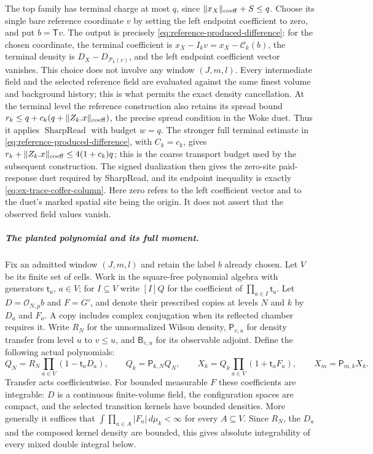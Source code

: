 The top family has terminal charge at most \(q\), since
\(\|x_X\|_{\rm coeff}+S\le q\). Choose its single bare reference coordinate \(v\) by
setting the left endpoint coefficient to zero, and put \(b=\mathsf Tv\).
The output is precisely
\eqref{eq:reference-produced-difference}: for the chosen coordinate, the
terminal coefficient is \(x_X-I_kv=x_X-\mathcal C_k(b)\), the terminal
density is
\(D_X-D_{\mathcal P_k(v)}\), and the left endpoint coefficient vector
vanishes. This choice does not involve any window \((J,m,l)\). Every intermediate field and the selected reference field are
evaluated against the same finest volume and background history; this is
what permits the exact density cancellation. At the terminal level the reference construction also retains its spread
bound \(r_k\le q+c_k(q+\|Z_k.x\|_{\rm coeff})\), the precise spread
condition in the Woke duet. Thus it applies \(\operatorname{SharpRead}\)
with budget \(w=q\). The stronger full terminal estimate in
\eqref{eq:reference-produced-difference}, with \(C_k=c_k\), gives
\(r_k+\|Z_k.x\|_{\rm coeff}\le4(1+c_k)q\); this is the coarse
transport budget used by the subsequent construction. The signed dualization
then gives the zero-site paid-response duet required by SharpRead, and its
endpoint inequality is exactly \eqref{eq:ex-trace-coffer-column}. Here zero refers to the left coefficient
vector and to the duet's marked spatial site being the origin. It does not
assert that the observed field values vanish.
\subparagraph{The planted polynomial and its full moment.}
Fix an admitted window $(J,m,l)$ and retain the label $b$ already chosen.
Let $V$ be its finite set of cells. Work in the square-free polynomial
algebra with generators $\mathsf t_a$, $a\in V$; for $I\subseteq V$
write $[I]Q$ for the coefficient of $\prod_{a\in I}\mathsf t_a$.
Let $D=\mathcal O_{N,p}b$ and $F=G'$, and denote their prescribed copies
at levels $N$ and $k$ by $D_a$ and $F_a$. A copy includes complex
conjugation when its reflected chamber requires it. Write $R_N$ for the
unnormalized Wilson density, $\mathsf P_{v,u}$ for density transfer
from level $u$ to $v\le u$, and $\mathsf B_{v,u}$ for its observable
adjoint. Define the following actual polynomials:
\begin{equation}\label{eq:coffer-planted-polynomial}
 Q_N=R_N\prod_{a\in V}(1-\mathsf t_aD_a),\qquad
 Q_k=\mathsf P_{k,N}Q_N,\qquad
 X_k=Q_k\prod_{a\in V}(1+\mathsf t_aF_a),\qquad
 X_m=\mathsf P_{m,k}X_k.
\end{equation}
Transfer acts coefficientwise. For bounded measurable $F$ these
coefficients are integrable: $D$ is a continuous finite-volume field,
the configuration spaces are compact, and the selected transition
kernels have bounded densities. More generally it suffices that
$\int\prod_{a\in A}|F_a|\,d\mu_k<\infty$ for every $A\subseteq V$.
Since $R_N$, the $D_a$ and the composed kernel density are bounded,
this gives absolute integrability of every mixed double integral below.

